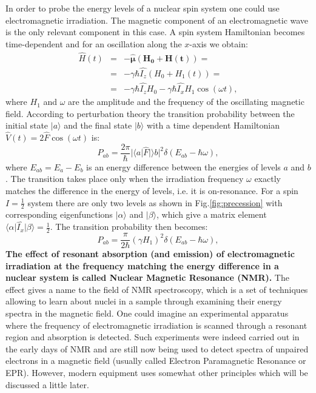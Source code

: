 \documentclass[a4paper, 12pt]{article}
\begin{document}
 In order to probe the energy levels of a nuclear spin system one could use electromagnetic irradiation. The magnetic component of an electromagnetic wave is the only relevant component in this case. A spin system Hamiltonian becomes time-dependent and for an oscillation along the $x$-axis we obtain:
\begin{equation} \label{eq:oscillating_field}
\begin{array}{lcl}
\hat{H}(t) &=& -\bm{\hat{\mu}} \bm{(H_0+H(t))}=  \\
 &=& -\gamma \hbar \hat{I_z} (H_0 + H_1(t)) =\\
 &=&-\gamma \hbar \hat{I_z} H_0  -\gamma \hbar \hat{I_x} H_1 \cos(\omega t),
\end{array}
\end{equation}
where $H_1$ and $\omega$ are the amplitude and the frequency of the oscillating magnetic field. According to perturbation theory the transition probability between the initial state $\vert a \rangle$ and the final state $\vert b \rangle$ with a time dependent Hamiltonian $ \hat{V} (t) = 2 \hat{F} \cos (\omega t ) $ is:
\begin{equation} \label{eq:probability}
P_{ab} = \frac{2 \pi}{\hbar} \vert \langle a \vert \hat{F} \vert \rangle b \vert ^2 \delta(E_{ab}-\hbar \omega),
\end{equation}
where $E_{ab} = E_a - E_b$ is an energy difference between the energies of levels $a$ and $b$. The transition takes place only when the irradiation frequency $\omega$ exactly matches the difference in the energy of levels, i.e. it is on-resonance. For a spin $I = \frac{1}{2}$ system there are only two levels as shown in Fig.\ref{fig:precession} with corresponding eigenfunctions $\vert \alpha \rangle$ and $\vert \beta \rangle$, which give a matrix element $\langle \alpha \vert \hat{I_x} \vert \beta \rangle = \frac{1}{2}$. The transition probability then becomes:
\begin{equation}
P_{ab} = \frac{\pi}{2\hbar} (\gamma H_1)^2 \delta(E_{ab}-\hbar \omega),
\end{equation}
 \textbf{The effect of resonant absorption (and emission) of electromagnetic irradiation at the frequency matching the energy difference in a nuclear system is called Nuclear Magnetic Resonance (NMR).} The effect gives a name to the field of NMR spectroscopy, which is a set of techniques allowing to learn about nuclei in a sample through examining their energy spectra in the magnetic field. One could imagine an experimental apparatus where the frequency of electromagnetic irradiation  is scanned through a resonant region and absorption is detected. Such experiments were indeed carried out in the early days of NMR and are still now being used to detect spectra of unpaired electrons in a magnetic field (usually called Electron Paramagnetic Resonance or EPR). However, modern equipment uses somewhat other principles which will be discussed a little later.
\end{document}
